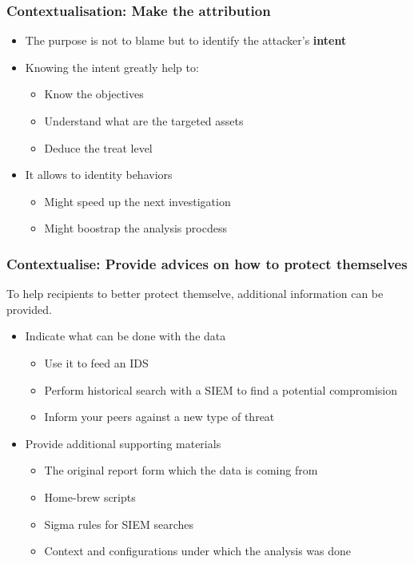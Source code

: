 \begin{frame}
    \frametitle{Contextualisation: Make the attribution}
    \begin{itemize}
        \item The purpose is not to blame but to identify the attacker's \textbf{intent}
        \item Knowing the intent greatly help to:
        \begin{itemize}
            \item Know the objectives
            \item Understand what are the targeted assets
            \item Deduce the treat level
        \end{itemize}
        \item It allows to identity behaviors
        \begin{itemize}
            \item Might speed up the next investigation
            \item Might boostrap the analysis procdess
        \end{itemize}
    \end{itemize}
\end{frame}

\begin{frame}
    \frametitle{Contextualise: Provide advices on how to protect themselves}
    To help recipients to better protect themselve, additional information can be provided.

    \begin{itemize}
        \item Indicate what can be done with the data
        \begin{itemize}
            \item Use it to feed an IDS
            \item Perform historical search with a SIEM to find a potential compromision
            \item Inform your peers against a new type of threat
        \end{itemize}
        \item Provide additional supporting materials
        \begin{itemize}
            \item The original report form which the data is coming from
            \item Home-brew scripts
            \item Sigma rules for SIEM searches
            \item Context and configurations under which the analysis was done
        \end{itemize}
    \end{itemize}
\end{frame}


